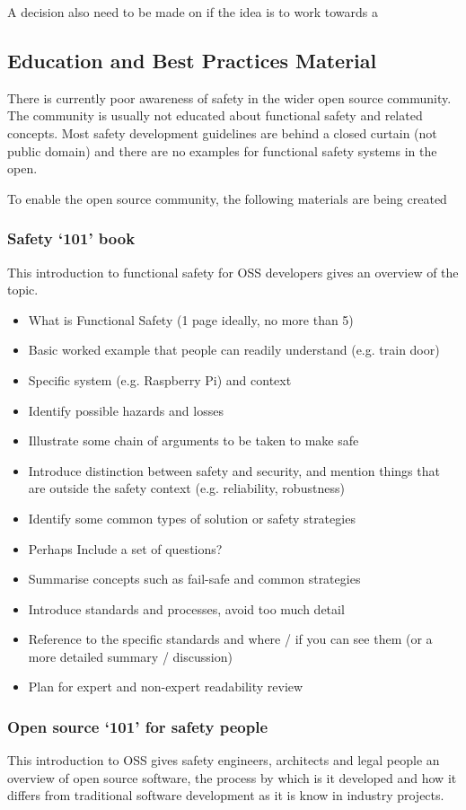 \documentclass[12pt]{../Common_files/ElisaPaper}
\begin{document}
A decision also need to be made on if the idea is to work towards a  
\subsection{Education and Best Practices Material}
There is currently poor awareness of safety in the wider open source community. 
The  community is usually not educated about functional safety and related concepts. 
Most safety development guidelines are behind a closed curtain (not public domain) and there are no examples for functional safety systems in the open.

To enable the open source community, the following materials are being created
\subsubsection{Safety ‘101’ book}
This introduction to functional safety for OSS developers gives an overview of the topic.
\begin{itemize}	
\item What is Functional Safety (1 page ideally, no more than 5)
\item Basic worked example that people can readily understand (e.g. train door)
\item Specific system (e.g. Raspberry Pi) and context
\item Identify possible hazards and losses
\item Illustrate some chain of arguments to be taken to make safe
\item Introduce distinction between safety and security, and mention things that are outside the safety context (e.g. reliability, robustness)
\item Identify some common types of solution or safety strategies
\item Perhaps Include a set of questions?
\item Summarise concepts such as fail-safe and common strategies 
\item Introduce standards and processes, avoid too much detail
\item Reference to the specific standards and where / if you can see them (or a more detailed summary / discussion)
\item Plan for expert and non-expert readability review
\end{itemize}


\subsubsection{Open source ‘101’ for safety people}
This introduction to OSS gives safety engineers, architects and legal people an overview of open source software, the process by which is it developed and how it differs from traditional software development as it is know in industry projects.
\end{document}

